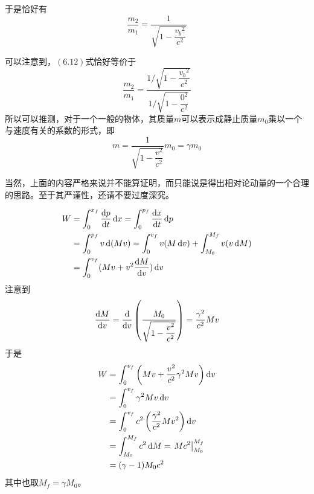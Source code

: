 \begin{prove}[$p=\gamma mv$]
    于是恰好有
    \begin{equation}
        \dfrac{m_2}{m_1}=\dfrac{1}{\sqrt{1-\dfrac{v_b{}^2}{c^2}}}
    \end{equation}

    可以注意到，$(6.12)$式恰好等价于
    \begin{equation}
        \dfrac{m_2}{m_1}=\dfrac{1/\sqrt{1-\dfrac{v_b{}^2}{c^2}}}{1/\sqrt{1-\dfrac{0^2}{c^2}}}
    \end{equation}
    所以可以推测，对于一个一般的物体，其质量$m$可以表示成静止质量$m_0$乘以一个与速度有关的系数的形式，即
    \begin{equation}
        m=\dfrac{1}{\sqrt{1-\dfrac{v^2}{c^2}}}m_0=\gamma m_0
    \end{equation}

    当然，上面的内容严格来说并不能算证明，而只能说是得出相对论动量的一个合理的思路。至于其严谨性，还请不要过度深究。
\end{prove}
\begin{prove}[$K=W=(\gamma -1)M_0c^2$]
    \[\begin{aligned}
            W & =\int_0^{x_f} \dfrac{\dif p}{\dif t}\dif x=\int_0^{p_f}\dfrac{\dif x}{\dif t}\dif p \\
              & =\int_0^{p_f}v\dif(Mv)=\int_0^{v_f}v(M\dif v)+\int_{M_0}^{M_f}v(v\dif M)            \\
              & =\int_0^{v_f}(Mv+v^2\dfrac{\dif M}{\dif v})\dif v
        \end{aligned}\]
    注意到
    \[\dfrac{\dif M}{\dif v}=\dfrac{\dif}{\dif v}\left(\dfrac{M_0}{\sqrt{1-\dfrac{v^2}{c^2}}}\right)=\dfrac{\gamma^2}{c^2} Mv\]
    于是
    \[\begin{aligned}
            W & =\int_0^{v_f}\left(Mv+\dfrac{v^2}{c^2}\gamma^2 Mv\right)\dif v \\
              & =\int_0^{v_f}\gamma^2Mv\dif v                                  \\
              & =\int_0^{v_f}c^2\left(\dfrac{\gamma^2}{c^2}Mv^2\right)\dif v   \\
              & =\int_{M_0}^{M_f}c^2\dif M=\left.Mc^2\right|_{M_0}^{M_f}       \\
              & =(\gamma-1)M_0c^2
        \end{aligned}\]
    其中也取$M_f=\gamma M_0$。
\end{prove}
